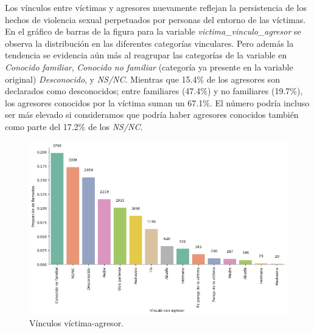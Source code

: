 \documentclass[10 pt]{article}
\begin{document}
Los vínculos entre víctimas y agresores nuevamente reflejan la persistencia de los hechos de violencia sexual perpetuados por personas del entorno de las víctimas. En el gráfico de barras de la figura  para la variable \textit{victima\_vinculo\_agresor} se observa la distribución en las diferentes categorías vinculares. Pero además la tendencia se evidencia aún más al reagrupar las categorías de la variable en \textit{Conocido familiar}, \textit{Conocido no familiar} (categoría ya presente en la variable original) \textit{Desconocido}, y \textit{NS/NC}. Mientras que 15.4\% de los agresores son declarados como desconocidos; entre familiares (47.4\%) y no familiares (19.7\%), los agresores conocidos por la víctima suman un 67.1\%. El número podría incluso ser más elevado si consideramos que podría haber agresores conocidos también como parte del 17.2\% de los \textit{NS/NC}.



\begin{figure}[H]
    \begin{center}
    \includegraphics[scale=.5]{images/latex_vinculo_agr_victima.png}
    \caption{Vínculos víctima-agresor.}
    \label{vinculoagresor}
    \end{center}
    \end{figure}
\end{document}
